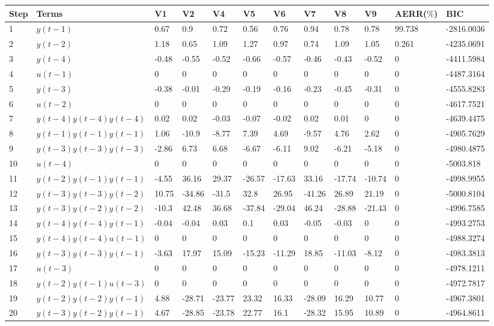 \begin{tabular}{llllllllllll}
Step & Terms & V1 & V2 & V4 & V5 & V6 & V7 & V8 & V9 & AERR($\%$) & BIC \\ 
\hline 
1 & $y(t-1)$ & 0.67 & 0.9 & 0.72 & 0.56 & 0.76 & 0.94 & 0.78 & 0.78 & 99.738 & -2816.0036 \\ 
2 & $y(t-2)$ & 1.18 & 0.65 & 1.09 & 1.27 & 0.97 & 0.74 & 1.09 & 1.05 & 0.261 & -4235.0691 \\ 
3 & $y(t-4)$ & -0.48 & -0.55 & -0.52 & -0.66 & -0.57 & -0.46 & -0.43 & -0.52 & 0 & -4411.5984 \\ 
4 & $u(t-1)$ & 0 & 0 & 0 & 0 & 0 & 0 & 0 & 0 & 0 & -4487.3164 \\ 
5 & $y(t-3)$ & -0.38 & -0.01 & -0.29 & -0.19 & -0.16 & -0.23 & -0.45 & -0.31 & 0 & -4555.8283 \\ 
6 & $u(t-2)$ & 0 & 0 & 0 & 0 & 0 & 0 & 0 & 0 & 0 & -4617.7521 \\ 
7 & $y(t-4)y(t-4)y(t-4)$ & 0.02 & 0.02 & -0.03 & -0.07 & -0.02 & 0.02 & 0.01 & 0 & 0 & -4639.4475 \\ 
8 & $y(t-1)y(t-1)y(t-1)$ & 1.06 & -10.9 & -8.77 & 7.39 & 4.69 & -9.57 & 4.76 & 2.62 & 0 & -4905.7629 \\ 
9 & $y(t-3)y(t-3)y(t-3)$ & -2.86 & 6.73 & 6.68 & -6.67 & -6.11 & 9.02 & -6.21 & -5.18 & 0 & -4980.4875 \\ 
10 & $u(t-4)$ & 0 & 0 & 0 & 0 & 0 & 0 & 0 & 0 & 0 & -5003.818 \\ 
11 & $y(t-2)y(t-1)y(t-1)$ & -4.55 & 36.16 & 29.37 & -26.57 & -17.63 & 33.16 & -17.74 & -10.74 & 0 & -4998.9955 \\ 
12 & $y(t-3)y(t-3)y(t-2)$ & 10.75 & -34.86 & -31.5 & 32.8 & 26.95 & -41.26 & 26.89 & 21.19 & 0 & -5000.8104 \\ 
13 & $y(t-3)y(t-2)y(t-2)$ & -10.3 & 42.48 & 36.68 & -37.84 & -29.04 & 46.24 & -28.88 & -21.43 & 0 & -4996.7585 \\ 
14 & $y(t-4)y(t-4)y(t-1)$ & -0.04 & -0.04 & 0.03 & 0.1 & 0.03 & -0.05 & -0.03 & 0 & 0 & -4993.2753 \\ 
15 & $y(t-4)y(t-4)u(t-1)$ & 0 & 0 & 0 & 0 & 0 & 0 & 0 & 0 & 0 & -4988.3274 \\ 
16 & $y(t-3)y(t-3)y(t-1)$ & -3.63 & 17.97 & 15.09 & -15.23 & -11.29 & 18.85 & -11.03 & -8.12 & 0 & -4983.3813 \\ 
17 & $u(t-3)$ & 0 & 0 & 0 & 0 & 0 & 0 & 0 & 0 & 0 & -4978.1211 \\ 
18 & $y(t-2)y(t-1)u(t-3)$ & 0 & 0 & 0 & 0 & 0 & 0 & 0 & 0 & 0 & -4972.7817 \\ 
19 & $y(t-2)y(t-2)y(t-1)$ & 4.88 & -28.71 & -23.77 & 23.32 & 16.33 & -28.09 & 16.29 & 10.77 & 0 & -4967.3801 \\ 
20 & $y(t-3)y(t-2)y(t-1)$ & 4.67 & -28.85 & -23.78 & 22.77 & 16.1 & -28.32 & 15.95 & 10.89 & 0 & -4964.8611 \\ 
\hline 
\end{tabular}